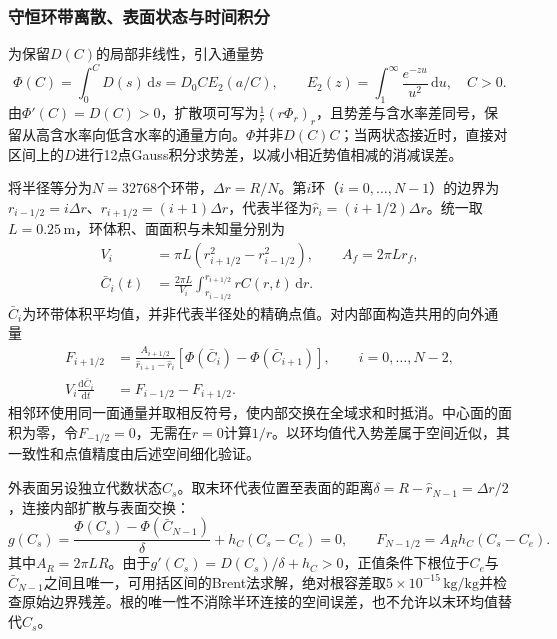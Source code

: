 \subsubsection{守恒环带离散、表面状态与时间积分}

为保留$D(C)$的局部非线性，引入通量势
\begin{equation}
\Phi(C)=\int_0^CD(s)\,\mathrm ds
       =D_0C E_2(a/C),\qquad
E_2(z)=\int_1^\infty\frac{e^{-zu}}{u^2}\,\mathrm du,\quad C>0.
\label{eq:q1-potential}
\end{equation}
由$\Phi'(C)=D(C)>0$，扩散项可写为$\frac1r(r\Phi_r)_r$，且势差与含水率差同号，保留从高含水率向低含水率的通量方向。$\Phi$并非$D(C)C$；当两状态接近时，直接对区间上的$D$进行12点Gauss积分求势差，以减小相近势值相减的消减误差。

将半径等分为$N=32768$个环带，$\Delta r=R/N$。第$i$环（$i=0,\ldots,N-1$）的边界为$r_{i-1/2}=i\Delta r$、$r_{i+1/2}=(i+1)\Delta r$，代表半径为$\hat r_i=(i+1/2)\Delta r$。统一取$L=0.25\,\mathrm m$，环体积、面面积与未知量分别为
\begin{equation}
\begin{aligned}
V_i&=\pi L(r_{i+1/2}^2-r_{i-1/2}^2),\qquad A_f=2\pi Lr_f,\\
\bar C_i(t)&=\frac{2\pi L}{V_i}
 \int_{r_{i-1/2}}^{r_{i+1/2}}rC(r,t)\,\mathrm dr.
\end{aligned}
\label{eq:q1-cell}
\end{equation}
$\bar C_i$为环带体积平均值，并非代表半径处的精确点值。对内部面构造共用的向外通量
\begin{equation}
\begin{aligned}
F_{i+1/2}&=\frac{A_{i+1/2}}{\hat r_{i+1}-\hat r_i}
 [\Phi(\bar C_i)-\Phi(\bar C_{i+1})],\qquad i=0,\ldots,N-2,\\
V_i\frac{\mathrm d\bar C_i}{\mathrm dt}&=F_{i-1/2}-F_{i+1/2}.
\end{aligned}
\label{eq:q1-fv}
\end{equation}
相邻环使用同一面通量并取相反符号，使内部交换在全域求和时抵消。中心面的面积为零，令$F_{-1/2}=0$，无需在$r=0$计算$1/r$。以环均值代入势差属于空间近似，其一致性和点值精度由后述空间细化验证。

外表面另设独立代数状态$C_s$。取末环代表位置至表面的距离$\delta=R-\hat r_{N-1}=\Delta r/2$，连接内部扩散与表面交换：
\begin{equation}
g(C_s)=\frac{\Phi(C_s)-\Phi(\bar C_{N-1})}{\delta}
          +h_C(C_s-C_e)=0,\qquad
F_{N-1/2}=A_Rh_C(C_s-C_e).
\label{eq:q1-surface}
\end{equation}
其中$A_R=2\pi LR$。由于$g'(C_s)=D(C_s)/\delta+h_C>0$，正值条件下根位于$C_e$与$\bar C_{N-1}$之间且唯一，可用括区间的Brent法求解，绝对根容差取$5\times10^{-15}\,\mathrm{kg/kg}$并检查原始边界残差。根的唯一性不消除半环连接的空间误差，也不允许以末环均值替代$C_s$。

